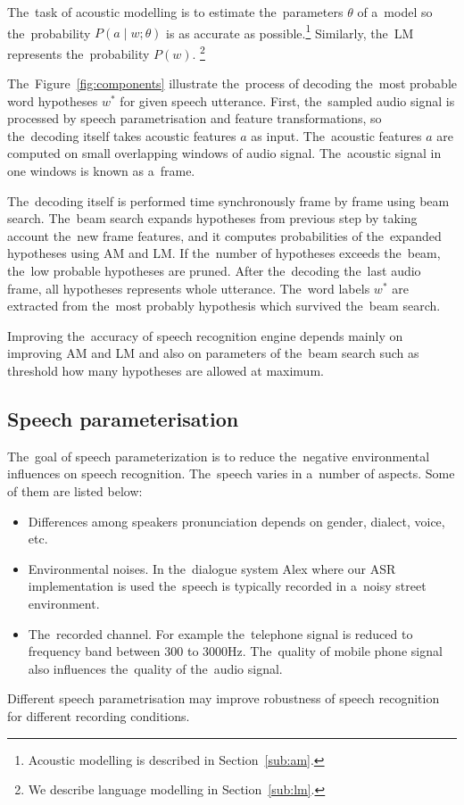 The~task of acoustic modelling is to estimate the~parameters $\theta$ of a~model so the~probability $P(a \mid w ; \theta)$ is as accurate as possible.\footnote{Acoustic modelling is described in Section~\ref{sub:am}.} 
Similarly, the~\ac{LM} represents the~probability $P(w)$. \footnote{We describe language modelling in Section~\ref{sub:lm}.}

The~Figure~\ref{fig:components} illustrate the~process of decoding the~most probable word hypotheses $w^*$ for given speech utterance. 
First, the~sampled audio signal is processed by speech parametrisation and feature transformations, so the~decoding itself takes acoustic features $a$ as input. The~acoustic features $a$ are computed on small overlapping windows of audio signal.
The~acoustic signal in one windows is known as a~frame.

The~decoding itself is performed time synchronously frame by frame using beam search.
The~beam search expands hypotheses from previous step by taking account the~new frame features, and it computes probabilities of the~expanded hypotheses using \ac{AM} and \ac{LM}.
If the~number of hypotheses exceeds the~beam, the~low probable hypotheses are pruned.
After the~decoding the~last audio frame, all hypotheses represents whole utterance.
The~word labels $w^*$ are extracted from the~most probably hypothesis which survived the~beam search.

Improving the~accuracy of speech recognition engine depends mainly on improving \ac{AM} and \ac{LM}
and also on parameters of the~beam search such as threshold how many hypotheses are allowed at maximum.


\subsection{Speech parameterisation}
\label{sub:param}
The~goal of speech parameterization is to reduce the~negative environmental influences on speech recognition.
The~speech varies in a~number of aspects. Some of them are listed below:
\begin{itemize}
    \item Differences among speakers pronunciation depends on gender, dialect, voice, etc.
    \item Environmental noises. In the~dialogue system Alex where our \ac{ASR} implementation is used the~speech is typically recorded in a~noisy street environment.
    \item The~recorded channel.
        For example the~telephone signal is reduced to frequency band between 300 to 3000Hz.
        The~quality of mobile phone signal also influences the~quality of the~audio signal.
\end{itemize}
Different speech parametrisation may improve robustness of speech recognition for different recording conditions.


